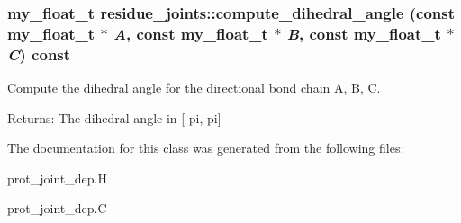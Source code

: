 \subsubsection{\setlength{\rightskip}{0pt plus 5cm}my\_\-float\_\-t residue\_\-joints::compute\_\-dihedral\_\-angle (const my\_\-float\_\-t $\ast$ {\em A}, const my\_\-float\_\-t $\ast$ {\em B}, const my\_\-float\_\-t $\ast$ {\em C}) const\hspace{0.3cm}{\tt  [private]}}\label{classASCbase_1_1residue__joints_23107db1da4a4930345c2d1dacd44194}


Compute the dihedral angle for the directional bond chain A, B, C. 

\begin{Desc}
\item[Returns:]The dihedral angle in [-pi, pi] \end{Desc}


The documentation for this class was generated from the following files:\begin{CompactItemize}
\item 
prot\_\-joint\_\-dep.H\item 
prot\_\-joint\_\-dep.C\end{CompactItemize}
